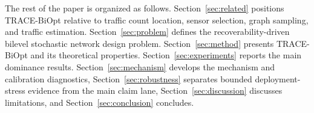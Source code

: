 The rest of the paper is organized as follows. Section~\ref{sec:related} positions TRACE-BiOpt relative to traffic count location, sensor selection, graph sampling, and traffic estimation. Section~\ref{sec:problem} defines the recoverability-driven bilevel stochastic network design problem. Section~\ref{sec:method} presents TRACE-BiOpt and its theoretical properties. Section~\ref{sec:experiments} reports the main dominance results. Section~\ref{sec:mechanism} develops the mechanism and calibration diagnostics, Section~\ref{sec:robustness} separates bounded deployment-stress evidence from the main claim lane, Section~\ref{sec:discussion} discusses limitations, and Section~\ref{sec:conclusion} concludes.

